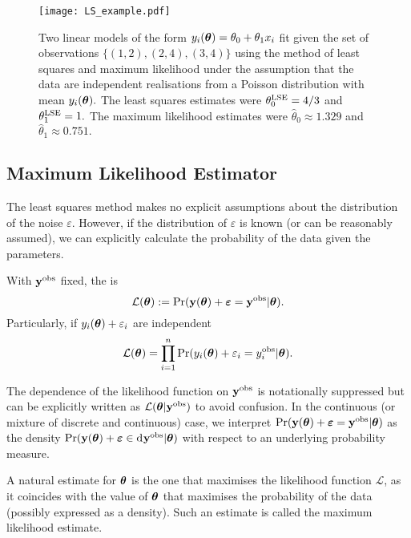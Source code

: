 \begin{figure}[htbp]
    \centering
    \texttt{[image: LS\_example.pdf]}
    \caption[{
        Maximum likelihood and least squares linear regression examples
    }]{
        Two linear models of the form
        $y_i(\bm{\theta}) = \theta_0 + \theta_1x_i$ fit given the set
        of observations $\{(1, 2), (2, 4), (3, 4)\}$ using the method of
        least squares and maximum likelihood under
        the assumption that the data are independent realisations from a Poisson
        distribution with mean $y_i(\bm{\theta}).$ The least squares estimates
        were $\theta^{\mathrm{LSE}}_0 = 4/3$ and $\theta^{\mathrm{LSE}}_1 = 1.$ The maximum likelihood
        estimates were $\hat{\theta}_0 \approx 1.329$ and
        $\hat{\theta}_1 \approx 0.751.$
    }
    \label{fig:LSE}
\end{figure}

\subsection*{Maximum Likelihood Estimator}

The least squares method makes no explicit assumptions about the distribution
of the noise $\varepsilon.$ However, if the distribution of $\varepsilon$ is
known (or can be reasonably assumed), we can
explicitly calculate the probability of the data given the parameters.

\begin{definition}
    With $\mathbf{y}^{\mathrm{obs}}$ fixed, the  is
    $$
        \mathcal{L}(\bm{\theta})
        := \Pr(
        \mathbf{y}(\bm{\theta}) + \bm{\varepsilon} = \mathbf{y}^{\mathrm{obs}}
        | \bm{\theta}
        ).
    $$
    Particularly, if $y_i(\bm{\theta}) + \varepsilon_i$ are independent
    $$
        \mathcal{L}(\bm{\theta})
        = \prod_{i = 1}^n
        \Pr(
        y_i(\bm{\theta}) + \varepsilon_i = y_i^{\mathrm{obs}}
        | \bm{\theta}
        ).
    $$
\end{definition}

The dependence of the likelihood function on $\mathbf{y}^{\mathrm{obs}}$ is notationally
suppressed but can be
explicitly written as $\mathcal{L}(\bm{\theta}|\mathbf{y}^{\mathrm{obs}})$ to avoid confusion.
In the continuous
(or mixture of discrete and continuous) case,
we interpret
$
    \Pr(
    \mathbf{y}(\bm{\theta}) + \bm{\varepsilon} = \mathbf{y}^{\mathrm{obs}}
    | \bm{\theta}
    )
$
as the density
$
    \Pr(
    \by(\btheta) + \bm{\varepsilon} \in \diff\by^\obs
    | \btheta
    )
$ with respect to an underlying probability measure.

A natural estimate for $\bm{\theta}$ is the one that maximises the likelihood
function $\mathcal{L}$, as it coincides with the value of $\bm{\theta}$
that maximises the
probability of the data (possibly expressed as a density).
Such an estimate is called the maximum likelihood
estimate.

